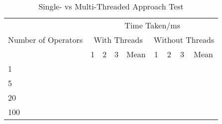 \documentclass[../../../../../main.tex]{subfiles}
\begin{document}
\begin{table}[ht] \caption{Single- vs Multi-Threaded Approach Test} %
\centering      %
\begin{tabular}{| l | l | l | l | l | l | l | l | l |}
\hline
\multicolumn{1}{|c|}{\multirow{3}{*}{Number of Operators}} & \multicolumn{8}{c|}{Time Taken/ms}                                                                                                                                                                          \\ \cline{2-9} 
\multicolumn{1}{|c|}{}                                     & \multicolumn{4}{c|}{With Threads}                                                                    & \multicolumn{4}{c|}{Without Threads}                                                                 \\ \cline{2-9} 
\multicolumn{1}{|c|}{}                                     & \multicolumn{1}{c|}{1} & \multicolumn{1}{c|}{2} & \multicolumn{1}{c|}{3} & \multicolumn{1}{c|}{Mean} & \multicolumn{1}{c|}{1} & \multicolumn{1}{c|}{2} & \multicolumn{1}{c|}{3} & \multicolumn{1}{c|}{Mean} \\ \hline
1                                                          &                        &                        &                        &                           &                        &                        &                        &                           \\ \hline
5                                                          &                        &                        &                        &                           &                        &                        &                        &                           \\ \hline
20                                                         &                        &                        &                        &                           &                        &                        &                        &                           \\ \hline
100                                                        &                        &                        &                        &                           &                        &                        &                        &                           \\ \hline
\end{tabular}
\label{tbl:parseAlgorithmTest}
\end{table}



\newpage
\end{document}
